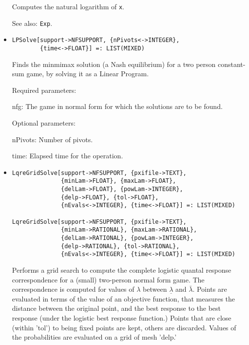 \begin{itemize}
\bd
Computes the natural logarithm of \verb+x+.
\item
[See also:] {\tt Exp}.
\ed

\item
\protect \large \begin{verbatim}
LPSolve[support->NFSUPPORT, {nPivots<->INTEGER},
        {time<->FLOAT}] =: LIST(MIXED)
\end{verbatim}\normalsize

\bd
Finds the minmimax solution (a Nash equilibrium) for a
two person constant-sum game, by solving it as a Linear Program.
\item
[Required parameters:]
\bd
\item
[nfg:] The game in normal form for which the solutions are to be found.  
\ed

\item
[Optional parameters:]\hfil\null

\bd
\item[nPivots:] Number of pivots. 
\item[time:] Elapsed time for the operation.
\ed
\ed

\item
\protect \large \begin{verbatim}
LqreGridSolve[support->NFSUPPORT, {pxifile->TEXT},
              {minLam->FLOAT}, {maxLam->FLOAT}, 
              {delLam->FLOAT}, {powLam->INTEGER}, 
              {delp->FLOAT}, {tol->FLOAT},
              {nEvals<->INTEGER}, {time<->FLOAT}] =: LIST(MIXED)

LqreGridSolve[support->NFSUPPORT, {pxifile->TEXT},
              {minLam->RATIONAL}, {maxLam->RATIONAL}, 
              {delLam->RATIONAL}, {powLam->INTEGER}, 
              {delp->RATIONAL}, {tol->RATIONAL},
              {nEvals<->INTEGER}, {time<->FLOAT}] =: LIST(MIXED)
\end{verbatim}\normalsize

\bd
Performs a grid search to compute the complete logistic
quantal response correspondence for a (small) two-person normal form
game.  The correspondence is computed for values of $\lambda$ between
$\underline{\lambda}$ and $\bar{\lambda}.$ Points are evaluated in
terms of the value of an objective function, that measures the
distance between the original point, and the best response to the best
response (under the logistic best response function.)  Points that are
close (within 'tol') to being fixed points are kept, others are
discarded.  Values of the probabilities are evaluated on a grid of
mesh 'delp.'


\end{itemize}

